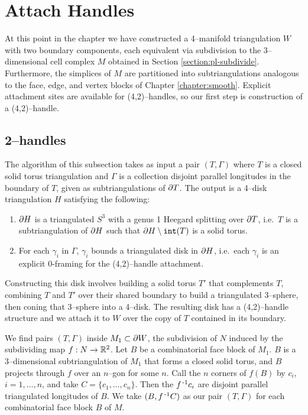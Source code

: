 \section{Attach Handles}
\label{section:pl-handle}

At this point in the chapter we have constructed a 4--manifold triangulation $W$ with two boundary components, each equivalent via subdivision to the 3--dimensional cell complex $M$ obtained in Section \ref{section:pl-subdivide}.
Furthermore, the simplices of $M$ are partitioned into subtriangulations analogous to the face, edge, and vertex blocks of Chapter \ref{chapter:smooth}.
Explicit attachment sites are available for (4,2)--handles, so our first step is construction of a (4,2)--handle.

\subsection{2--handles}
\label{section:pl-2-handle}

The algorithm of this subsection takes as input a pair $(T,\Gamma)$ where $T$ is a closed solid torus triangulation and $\Gamma$ is a collection disjoint parallel longitudes in the boundary of $T$, given as subtriangulations of $\partial T$.
The output is a 4--disk triangulation $H$ satisfying the following:
\begin{enumerate}
	\item $\partial H$ is a triangulated $S^3$ with a genus 1 Heegard splitting over $\partial T$, i.e.\ $T$ is a subtriangulation of $\partial H$ such that $\partial H\setminus \texttt{int}(T)$ is a solid torus.
	\item For each $\gamma_i$ in $\Gamma$, $\gamma_i$ bounds a triangulated disk in $\partial H$, i.e.\ each $\gamma_i$ is an explicit 0-framing for the (4,2)--handle attachment.
\end{enumerate}
Constructing this disk involves building a solid torus $T'$ that complements $T$, combining $T$ and $T'$ over their shared boundary to build a triangulated 3--sphere, then coning that 3--sphere into a 4--disk.
The resulting disk has a (4,2)--handle structure and we attach it to $W$ over the copy of $T$ contained in its boundary.

We find pairs $(T,\Gamma)$ inside $M_1\subset\partial W$, the subdivision of $N$ induced by the subdividing map $f:N\to\mathbb{R}^2$.
Let $B$ be a combinatorial face block of $M_1$.
$B$ is a 3--dimensional subtriangulation of $M_1$ that forms a closed solid torus,
and $B$ projects through $f$ over an $n$--gon for some $n$.
Call the $n$ corners of $f(B)$ by $c_i$, $i=1,\dots, n$, and take $C=\{c_1,\dots, c_n\}$.
Then the $f^{\,\text{-}1} c_i$ are disjoint parallel triangulated longitudes of $B$.
We take $(B, f^{\,\text{-}1} C)$ as our pair $(T,\Gamma)$ for each combinatorial face block $B$ of $M$.

